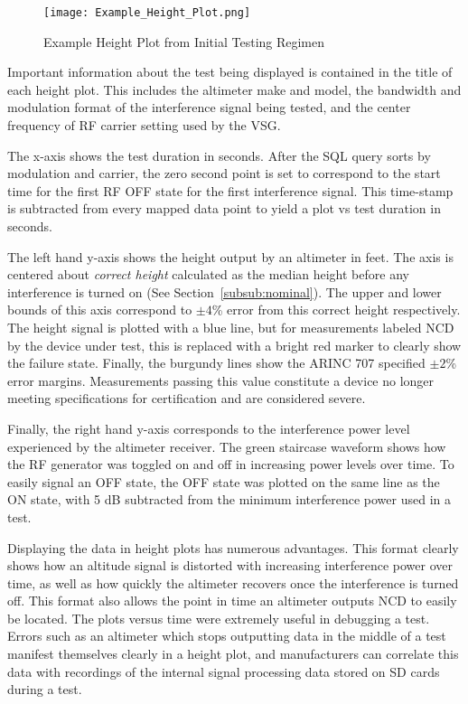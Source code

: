\begin{figure}[h!]
	\centering
	\texttt{[image: Example\_Height\_Plot.png]}
	\caption{Example Height Plot from Initial Testing Regimen}
	\label{fig:height_plot_example}
\end{figure}
Important information about the test being displayed is contained in the title of each height plot. This includes the altimeter make and model, the bandwidth and modulation format of the interference signal being tested, and the center frequency of RF carrier setting used by the VSG.

The x-axis shows the test duration in seconds. After the SQL query sorts by modulation and carrier, the zero second point is set to correspond to the start time for the first RF OFF state for the first interference signal. This time-stamp is subtracted from every mapped data point to yield a plot vs test duration in seconds.

The left hand y-axis shows the height output by an altimeter in feet. The axis is centered about \textit{correct height} calculated as the median height before any interference is turned on (See Section~\ref{subsub:nominal}). The upper and lower bounds of this axis correspond to $\pm4$\% error from this correct height respectively. The height signal is plotted with a blue line, but for measurements labeled NCD by the device under test, this is replaced with a bright red marker to clearly show the failure state. Finally, the burgundy lines show the ARINC 707 specified $\pm2$\% error margins. Measurements passing this value constitute a device no longer meeting specifications for certification and are considered severe.  

Finally, the right hand y-axis corresponds to the interference power level experienced by the altimeter receiver. The green staircase waveform shows how the RF generator was toggled on and off in increasing power levels over time. To easily signal an OFF state, the OFF state was plotted on the same line as the ON state, with 5 dB subtracted from the minimum interference power used in a test. 

Displaying the data in height plots has numerous advantages. This format clearly shows how an altitude signal is distorted with increasing interference power over time, as well as how quickly the altimeter recovers once the interference is turned off. This format also allows the point in time an altimeter outputs NCD to easily be located. The plots versus time were extremely useful in debugging a test. Errors such as an altimeter which stops outputting data in the middle of a test manifest themselves clearly in a height plot, and manufacturers can correlate this data with recordings of the internal signal processing data stored on SD cards during a test.  
